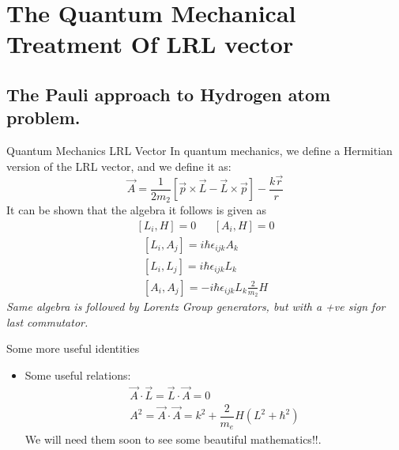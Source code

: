 \documentclass{beamer}
\begin{document}
\section{The Quantum Mechanical Treatment Of LRL vector}
\subsection{The Pauli approach to Hydrogen atom problem.}
\begin{frame}{Quantum Mechanics LRL Vector}
    In quantum mechanics, we define a Hermitian version of the LRL vector, and we define it as:
    \begin{equation}
        \label{eq:lrl-qm}
        \Vec{A} = \dfrac{1}{2m_2} \left[ \Vec{p} \times \Vec{L} - \Vec{L} \times \Vec{p}  \right] -\dfrac{k \Vec{r}}{r}
    \end{equation}
    It can be shown that the algebra it follows is given as
    \begin{equation*}
    \begin{aligned}
     [L_i, H] = 0 &&  [A_i, H] = 0
    \end{aligned}
    \end{equation*}
    \begin{equation}\label{eq:commut-unmod}
    \begin{gathered}
       [L_i, A_j] = i \hbar \epsilon_{ijk} A_k\\
        [L_i, L_j] = i \hbar \epsilon_{ijk} L_k \\
        [A_i, A_j] = -i \hbar \epsilon_{ijk} L_k \frac{2}{m_2} H
    \end{gathered}
    \end{equation}
    \textit{Same algebra is followed by Lorentz Group generators, but with a +ve sign for last commutator.}
\end{frame}

\begin{frame}{Some more useful identities}
\begin{itemize}
    \item Some useful relations:
    \begin{equation}\label{eq:useful-relations}
    \begin{gathered}
        \Vec{A} \cdot \Vec{L} = \Vec{L} \cdot \Vec{A} = 0\\
        A^2 = \Vec{A} \cdot \Vec{A} = k^2 + \dfrac{2}{m_e} H (L^2  + \hbar^2)
    \end{gathered}
    \end{equation}
    We will need them soon to see some beautiful mathematics!!.
\end{itemize}
\end{frame}
\end{document}
